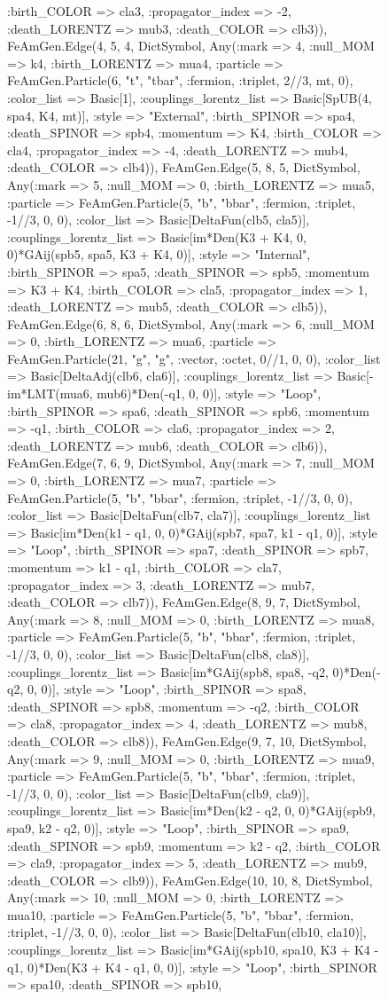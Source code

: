 \documentclass{revtex4}
\begin{document}
\begin{figure}[!htb]
\begin{center}
{:birth_COLOR => cla3, :propagator_index => -2, :death_LORENTZ => mub3, :death_COLOR => clb3)), FeAmGen.Edge(4, 5, 4, Dict{Symbol, Any}(:mark => 4, :null_MOM => k4, :birth_LORENTZ => mua4, :particle => FeAmGen.Particle(6, "t", "tbar", :fermion, :triplet, 2//3, mt, 0), :color_list => Basic[1], :couplings_lorentz_list => Basic[SpUB(4, spa4, K4, mt)], :style => "External", :birth_SPINOR => spa4, :death_SPINOR => spb4, :momentum => K4, :birth_COLOR => cla4, :propagator_index => -4, :death_LORENTZ => mub4, :death_COLOR => clb4)), FeAmGen.Edge(5, 8, 5, Dict{Symbol, Any}(:mark => 5, :null_MOM => 0, :birth_LORENTZ => mua5, :particle => FeAmGen.Particle(5, "b", "bbar", :fermion, :triplet, -1//3, 0, 0), :color_list => Basic[DeltaFun(clb5, cla5)], :couplings_lorentz_list => Basic[im*Den(K3 + K4, 0, 0)*GAij(spb5, spa5, K3 + K4, 0)], :style => "Internal", :birth_SPINOR => spa5, :death_SPINOR => spb5, :momentum => K3 + K4, :birth_COLOR => cla5, :propagator_index => 1, :death_LORENTZ => mub5, :death_COLOR => clb5)), FeAmGen.Edge(6, 8, 6, Dict{Symbol, Any}(:mark => 6, :null_MOM => 0, :birth_LORENTZ => mua6, :particle => FeAmGen.Particle(21, "g", "g", :vector, :octet, 0//1, 0, 0), :color_list => Basic[DeltaAdj(clb6, cla6)], :couplings_lorentz_list => Basic[-im*LMT(mua6, mub6)*Den(-q1, 0, 0)], :style => "Loop", :birth_SPINOR => spa6, :death_SPINOR => spb6, :momentum => -q1, :birth_COLOR => cla6, :propagator_index => 2, :death_LORENTZ => mub6, :death_COLOR => clb6)), FeAmGen.Edge(7, 6, 9, Dict{Symbol, Any}(:mark => 7, :null_MOM => 0, :birth_LORENTZ => mua7, :particle => FeAmGen.Particle(5, "b", "bbar", :fermion, :triplet, -1//3, 0, 0), :color_list => Basic[DeltaFun(clb7, cla7)], :couplings_lorentz_list => Basic[im*Den(k1 - q1, 0, 0)*GAij(spb7, spa7, k1 - q1, 0)], :style => "Loop", :birth_SPINOR => spa7, :death_SPINOR => spb7, :momentum => k1 - q1, :birth_COLOR => cla7, :propagator_index => 3, :death_LORENTZ => mub7, :death_COLOR => clb7)), FeAmGen.Edge(8, 9, 7, Dict{Symbol, Any}(:mark => 8, :null_MOM => 0, :birth_LORENTZ => mua8, :particle => FeAmGen.Particle(5, "b", "bbar", :fermion, :triplet, -1//3, 0, 0), :color_list => Basic[DeltaFun(clb8, cla8)], :couplings_lorentz_list => Basic[im*GAij(spb8, spa8, -q2, 0)*Den(-q2, 0, 0)], :style => "Loop", :birth_SPINOR => spa8, :death_SPINOR => spb8, :momentum => -q2, :birth_COLOR => cla8, :propagator_index => 4, :death_LORENTZ => mub8, :death_COLOR => clb8)), FeAmGen.Edge(9, 7, 10, Dict{Symbol, Any}(:mark => 9, :null_MOM => 0, :birth_LORENTZ => mua9, :particle => FeAmGen.Particle(5, "b", "bbar", :fermion, :triplet, -1//3, 0, 0), :color_list => Basic[DeltaFun(clb9, cla9)], :couplings_lorentz_list => Basic[im*Den(k2 - q2, 0, 0)*GAij(spb9, spa9, k2 - q2, 0)], :style => "Loop", :birth_SPINOR => spa9, :death_SPINOR => spb9, :momentum => k2 - q2, :birth_COLOR => cla9, :propagator_index => 5, :death_LORENTZ => mub9, :death_COLOR => clb9)), FeAmGen.Edge(10, 10, 8, Dict{Symbol, Any}(:mark => 10, :null_MOM => 0, :birth_LORENTZ => mua10, :particle => FeAmGen.Particle(5, "b", "bbar", :fermion, :triplet, -1//3, 0, 0), :color_list => Basic[DeltaFun(clb10, cla10)], :couplings_lorentz_list => Basic[im*GAij(spb10, spa10, K3 + K4 - q1, 0)*Den(K3 + K4 - q1, 0, 0)], :style => "Loop", :birth_SPINOR => spa10, :death_SPINOR => spb10, }
\end{center}
\end{figure}
\end{document}

